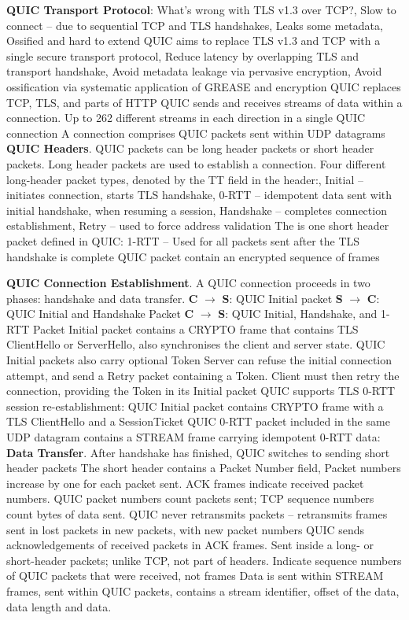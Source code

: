 \documentclass{article}
\begin{document}
\textbf{QUIC Transport Protocol}:
What’s wrong with TLS v1.3 over TCP?,
Slow to connect – due to sequential TCP and TLS handshakes,
Leaks some metadata,
Ossified and hard to extend
QUIC aims to replace TLS v1.3 and TCP with a single secure transport protocol,
Reduce latency by overlapping TLS and transport handshake,
Avoid metadata leakage via pervasive encryption,
Avoid ossification via systematic application of GREASE and encryption
QUIC replaces TCP, TLS, and parts of HTTP
QUIC sends and receives streams of data within a connection.
Up to 262 different streams in each direction in a single QUIC connection
A connection comprises QUIC packets sent within UDP datagrams
\textbf{QUIC Headers}. QUIC packets can be long header packets or short header packets.
Long header packets are used to establish a connection.
Four different long-header packet types, denoted
by the TT field in the header:,
Initial – initiates connection, starts TLS handshake,
0-RTT – idempotent data sent with initial handshake, when resuming a session,
Handshake – completes connection establishment,
Retry – used to force address validation
The is one short header packet defined in QUIC:
1-RTT – Used for all packets sent after the TLS handshake is complete
QUIC packet contain an encrypted sequence of frames

\textbf{QUIC Connection Establishment}. A QUIC connection proceeds in two phases: handshake and data transfer.
\textbf{C} $\rightarrow$ \textbf{S}: QUIC Initial packet
\textbf{S} $\rightarrow$ \textbf{C}: QUIC Initial and Handshake Packet
\textbf{C} $\rightarrow$ \textbf{S}: QUIC Initial, Handshake, and 1-RTT Packet
Initial packet contains a CRYPTO frame that contains TLS ClientHello or ServerHello, also synchronises the client and server state.
QUIC Initial packets also carry optional Token Server can refuse the initial connection attempt,
and send a Retry packet containing a Token.
Client must then retry the connection, providing the Token in its Initial packet
QUIC supports TLS 0-RTT session re-establishment: QUIC Initial packet contains CRYPTO frame with a TLS ClientHello
and a SessionTicket QUIC 0-RTT packet included in the same UDP datagram contains a STREAM frame carrying idempotent 0-RTT data:
\textbf{Data Transfer}. After handshake has finished, QUIC switches to sending short header packets
The short header contains a Packet Number field, Packet numbers increase by one for each packet sent.
ACK frames indicate received packet numbers. QUIC packet numbers count packets sent; TCP sequence numbers count bytes of data sent.
QUIC never retransmits packets – retransmits frames sent in lost packets in new packets, with new packet numbers
QUIC sends acknowledgements of received packets in ACK frames.
Sent inside a long- or short-header packets; unlike TCP, not part of headers.
Indicate sequence numbers of QUIC packets that were received, not frames
Data is sent within STREAM frames, sent within QUIC packets, contains a stream identifier, offset of the data, data length and data.
\end{document}
